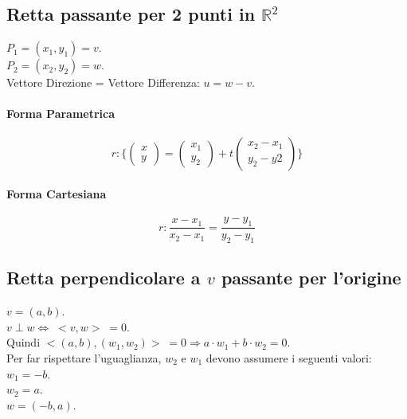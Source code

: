 \documentclass{article}
\begin{document}
\subsection{Retta passante per 2 punti in $\mathbb{R}^2$}

$P_1 = (x_1, y_1) = v$. \\
$P_2 = (x_2, y_2) = w$. \\
Vettore Direzione = Vettore Differenza: $u = w - v$.

\paragraph{Forma Parametrica}

\begin{equation*}
    r : \{ 
    \begin{pmatrix}
        x \\
        y
    \end{pmatrix} =
    \begin{pmatrix}
        x_1 \\
        y_2
    \end{pmatrix} + t
    \begin{pmatrix}
        x_2 - x_1 \\
        y_2 - y2
    \end{pmatrix}
    \}
\end{equation*}

\paragraph{Forma Cartesiana}

\begin{equation*}
    r: \frac{x - x_1}{x_2 - x_1} = \frac{y - y_1}{y_2 - y_1}
\end{equation*}

\subsection{Retta perpendicolare a $v$ passante per l'origine}

$v = (a, b)$. \\
$v \perp w \Leftrightarrow \; <v, w> \; = 0$. \\
Quindi $<(a, b), (w_1, w_2)> \; = 0 \Rightarrow a \cdot w_1 + b \cdot w_2 = 0$. \\
Per far rispettare l'uguaglianza, $w_2$ e $w_1$ devono assumere i seguenti valori: \\
$w_1 = -b$. \\
$w_2 = a$. \\
$w = (-b, a)$.
\end{document}
